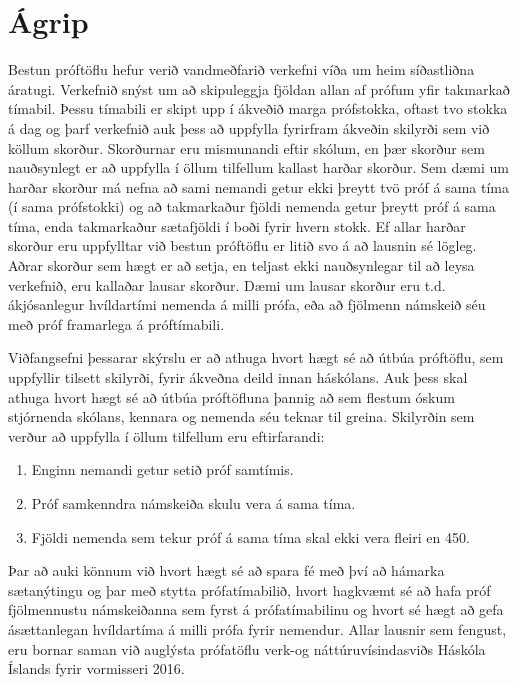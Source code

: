 \documentclass[12pt]{article}
\begin{document}
\newpage

\section{Ágrip}
Bestun próftöflu hefur verið vandmeðfarið verkefni víða um heim síðastliðna áratugi. Verkefnið snýst um að skipuleggja fjöldan allan af prófum yfir takmarkað tímabil. Þessu tímabili er skipt upp í ákveðið marga prófstokka, oftast tvo stokka á dag og þarf verkefnið auk þess að uppfylla fyrirfram ákveðin skilyrði sem við köllum skorður. Skorðurnar eru mismunandi eftir skólum, en þær skorður sem nauðsynlegt er að uppfylla í öllum tilfellum kallast harðar skorður. Sem dæmi um harðar skorður má nefna að sami nemandi getur ekki þreytt tvö próf á sama tíma (í sama prófstokki) og að takmarkaður fjöldi nemenda getur þreytt próf á sama tíma, enda takmarkaður sætafjöldi í boði fyrir hvern stokk. Ef allar harðar skorður eru uppfylltar við bestun próftöflu er litið svo á að lausnin sé lögleg. Aðrar skorður sem hægt er að setja, en teljast ekki nauðsynlegar til að leysa verkefnið, eru kallaðar lausar skorður. Dæmi um lausar skorður eru t.d. ákjósanlegur hvíldartími nemenda á milli prófa, eða að fjölmenn námskeið séu með próf framarlega á próftímabili.
\medskip

Viðfangsefni þessarar skýrslu er að athuga hvort hægt sé að útbúa próftöflu, sem uppfyllir tilsett skilyrði, fyrir ákveðna deild innan háskólans. Auk þess skal athuga hvort hægt sé að útbúa próftöfluna þannig að sem flestum óskum stjórnenda skólans, kennara og nemenda séu teknar til greina. Skilyrðin sem verður að uppfylla í öllum tilfellum eru eftirfarandi:


\begin{enumerate}
\item Enginn nemandi getur setið próf samtímis.
\item Próf samkenndra námskeiða skulu vera á sama tíma.
\item Fjöldi nemenda sem tekur próf á sama tíma skal ekki vera fleiri en 450.
\end{enumerate}

Þar að auki könnum við hvort hægt sé að spara fé með því að hámarka sætanýtingu og þar með stytta prófatímabilið, hvort hagkvæmt sé að hafa próf fjölmennustu námskeiðanna sem fyrst á prófatímabilinu og hvort sé hægt að gefa ásættanlegan hvíldartíma á milli prófa fyrir nemendur. Allar lausnir sem fengust, eru bornar saman við auglýsta prófatöflu verk-og náttúruvísindasviðs Háskóla Íslands fyrir vormisseri 2016.
\newpage
\end{document}
